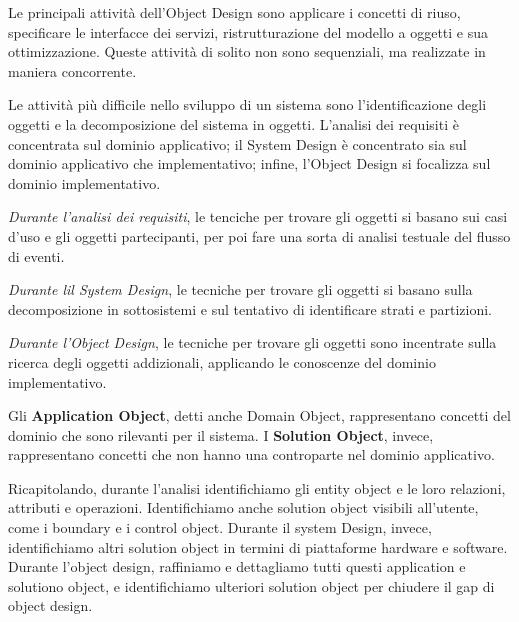 \documentclass{article}
\begin{document}
    \vspace{3mm}
    
    Le principali attività dell'Object Design sono applicare i concetti di riuso, specificare le interfacce dei servizi, ristrutturazione del modello a oggetti e sua ottimizzazione. Queste attività di solito non sono sequenziali, ma realizzate in maniera concorrente.
    
    \vspace{3mm}
    
    Le attività più difficile nello sviluppo di un sistema sono l'identificazione degli oggetti e la decomposizione del sistema in oggetti. L'analisi dei requisiti è concentrata sul dominio applicativo; il System Design è concentrato sia sul dominio applicativo che implementativo; infine, l'Object Design si focalizza sul dominio implementativo.
    
    \vspace{3mm}
    
    \textit{Durante l'analisi dei requisiti}, le tenciche per trovare gli oggetti si basano sui casi d'uso e gli oggetti partecipanti, per poi fare una sorta di analisi testuale del flusso di eventi.
    
    \textit{Durante lil System Design}, le tecniche per trovare gli oggetti si basano sulla decomposizione in sottosistemi e sul tentativo di identificare strati e partizioni. 
    
    \textit{Durante l'Object Design}, le tecniche per trovare gli oggetti sono incentrate sulla ricerca degli oggetti addizionali, applicando le conoscenze del dominio implementativo.
    
    \vspace{3mm}
    
    Gli \textbf{Application Object}, detti anche Domain Object, rappresentano concetti del dominio che sono rilevanti per il sistema. I \textbf{Solution Object}, invece, rappresentano concetti che non hanno una controparte nel dominio applicativo.
    
    \vspace{3mm}
    
    Ricapitolando, durante l'analisi identifichiamo gli entity object e le loro relazioni, attributi e operazioni. Identifichiamo anche solution object visibili all'utente, come i boundary e i control object. Durante il system Design, invece, identifichiamo altri solution object in termini di piattaforme hardware e software. Durante l'object design, raffiniamo e dettagliamo tutti questi application e solutiono object, e identifichiamo ulteriori solution object per chiudere il gap di object design.
    
\end{document}

